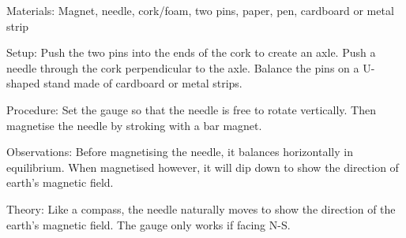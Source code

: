 \begin{multicols}{2}
\begin{description*}
\item[Materials:]{Magnet, needle, cork/foam, two pins, paper, pen, cardboard or metal strip}
\item[Setup:]{Push the two pins into the ends of the cork to create an axle. Push a needle through the cork perpendicular to the axle. Balance the pins on a U-shaped stand made of cardboard or metal strips.}
\item[Procedure:]{Set the gauge so that the needle is free to rotate vertically. Then magnetise the needle by stroking with a bar magnet.}
\item[Observations:]{Before magnetising the needle, it balances horizontally in equilibrium. When magnetised however, it will dip down to show the direction of earth's magnetic field.}
\item[Theory:]{Like a compass, the needle naturally moves to show the direction of the earth's magnetic field. The gauge only works if facing N-S.}
\end{description*}





\end{multicols}

\pagebreak